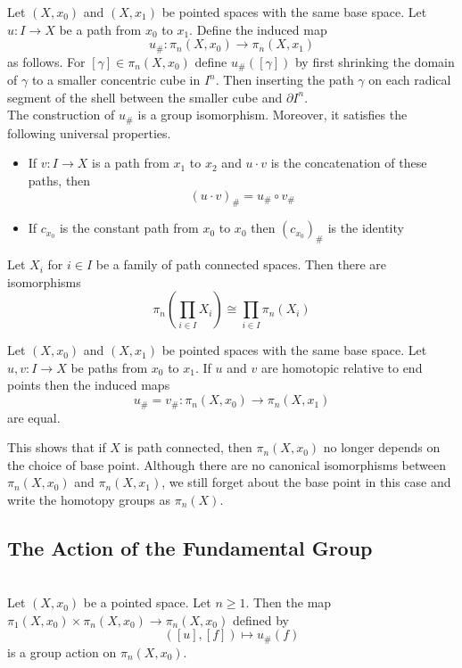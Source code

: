 \documentclass[a4paper]{article}
\begin{document}
\begin{thm}{}{} Let $(X,x_0)$ and $(X,x_1)$ be pointed spaces with the same base space. Let $u:I\to X$ be a path from $x_0$ to $x_1$. Define the induced map $$u_\#:\pi_n(X,x_0)\to\pi_n(X,x_1)$$ as follows. For $[\gamma]\in\pi_n(X,x_0)$ define $u_\#([\gamma])$ by first shrinking the domain of $\gamma$ to a smaller concentric cube in $I^n$. Then inserting the path $\gamma$ on each radical segment of the shell between the smaller cube and $\partial I^n$. \\
The construction of $u_\#$ is a group isomorphism. Moreover, it satisfies the following universal properties. 
\begin{itemize}
\item If $v:I\to X$ is a path from $x_1$ to $x_2$ and $u\cdot v$ is the concatenation of these paths, then $$(u\cdot v)_\#=u_\#\circ v_\#$$
\item If $c_{x_0}$ is the constant path from $x_0$ to $x_0$ then $(c_{x_0})_\#$ is the identity
\end{itemize}
\end{thm}

\begin{prp}{}{} Let $X_i$ for $i\in I$ be a family of path connected spaces. Then there are isomorphisms $$\pi_n\left(\prod_{i\in I}X_i\right)\cong\prod_{i\in I}\pi_n(X_i)$$
\end{prp}

\begin{prp}{}{} Let $(X,x_0)$ and $(X,x_1)$ be pointed spaces with the same base space. Let $u,v:I\to X$ be paths from $x_0$ to $x_1$. If $u$ and $v$ are homotopic relative to end points then the induced maps $$u_\#=v_\#:\pi_n(X,x_0)\to\pi_n(X,x_1)$$ are equal. 
\end{prp}

This shows that if $X$ is path connected, then $\pi_n(X,x_0)$ no longer depends on the choice of base point. Although there are no canonical isomorphisms between $\pi_n(X,x_0)$ and $\pi_n(X,x_1)$, we still forget about the base point in this case and write the homotopy groups as $\pi_n(X)$. 

\subsection{The Action of the Fundamental Group}
\begin{prp}{}{}\\
Let $(X,x_0)$ be a pointed space. Let $n\geq 1$. Then the map $\pi_1(X,x_0)\times\pi_n(X,x_0)\to\pi_n(X,x_0)$ defined by $$([u],[f])\mapsto u_\#(f)$$ is a group action on $\pi_n(X,x_0)$. 
\end{prp}
\end{document}

